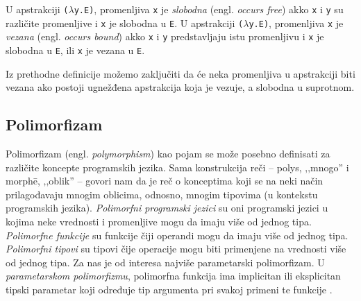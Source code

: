 \begin{definicija}
	U apstrakciji \verb|(|$\lambda$\verb|y.E)|, promenljiva \verb|x| je \textit{slobodna} (engl. \textit{occurs free}) akko \verb|x| i \verb|y| su različite promenljive i \verb|x| je slobodna u \verb|E|. U apstrakciji \verb|(|$\lambda$\verb|y.E)|, promenljiva \verb|x| je \textit{vezana} (engl. \textit{occurs bound}) akko \verb|x| i \verb|y| predstavljaju istu promenljivu i \verb|x| je slobodna u \verb|E|, ili \verb|x| je vezana u \verb|E|.
\end{definicija}

Iz prethodne definicije možemo zaključiti da će neka promenljiva u apstrakciji biti vezana ako postoji ugnežđena apstrakcija koja je vezuje, a slobodna u suprotnom.

\subsection{Polimorfizam}
\label{subsec:polimorfizam}

Polimorfizam (engl. \textit{polymorphism}) kao pojam se može posebno definisati za različite koncepte programskih jezika. Sama konstrukcija reči -- polys, ‚‚mnogo'' i morph\={e}, ‚‚oblik'' -- govori nam da je reč o konceptima koji se na neki način prilagođavaju mnogim oblicima, odnosno, mnogim tipovima (u kontekstu programskih jezika). \textit{Polimorfni programski jezici} su oni programski jezici u kojima neke vrednosti i promenljive mogu da imaju više od jednog tipa. \textit{Polimorfne funkcije} su funkcije čiji operandi mogu da imaju više od jednog tipa. \textit{Polimorfni tipovi} su tipovi čije operacije mogu biti primenjene na vrednosti više od jednog tipa. Za nas je od interesa najviše parametarski polimorfizam. U \textit{parametarskom polimorfizmu}, polimorfna funkcija ima implicitan ili eksplicitan tipski parametar koji određuje tip argumenta pri svakoj primeni te funkcije \cite{On-Understanding-Types-Data-Abstraction-and-Polymorphism}.